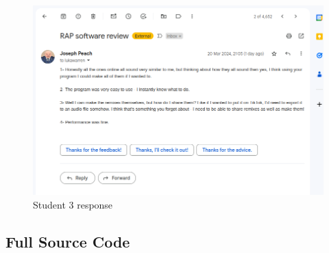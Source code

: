 \documentclass{article}
\begin{document}
	\begin{figure}[H]
		\includegraphics[width=14cm]{./joseph evaluation.png}
		\caption{Student 3 response}
	\end{figure}
	
	\pagebreak
	\subsection{Full Source Code}
	
\end{document}

